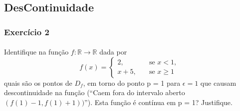 \documentclass{article}
\begin{document}
\subsection{DesContinuidade}
\subsubsection{Exerc\'icio 2}
\paragraph{} Identifique na fun\c c\~ao $f:\mathbb{R}\rightarrow\mathbb{R}$ dada por
$$
	f(x) = \left\{\begin{array}{ll}
		2,     & \quad \text{se } x < 1,  \\
		x + 5, & \quad \text{se } x\geq 1
	\end{array}\right.
$$
quais s\~ao os pontos de $D_f$, em torno do ponto p = 1 para $\epsilon = 1$ que causam descontinuidade na fun\c c\~ao (``Caem fora do intervalo aberto $(f(1) - 1, f(1) + 1))$''). Esta fun\c c\~ao \'e cont\'inua em p = 1? Justifique.
\end{document}
